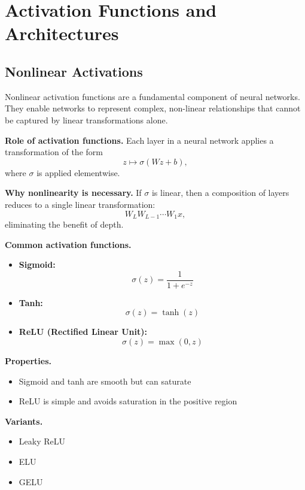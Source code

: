 \chapter{Activation Functions and Architectures}

\section{Nonlinear Activations}

Nonlinear activation functions are a fundamental component of neural networks. They enable networks to represent complex, non-linear relationships that cannot be captured by linear transformations alone.

\medskip

\noindent
\textbf{Role of activation functions.}  
Each layer in a neural network applies a transformation of the form
\[
z \mapsto \sigma(W z + b),
\]
where $\sigma$ is applied elementwise.

\medskip

\noindent
\textbf{Why nonlinearity is necessary.}  
If $\sigma$ is linear, then a composition of layers reduces to a single linear transformation:
\[
W_L W_{L-1} \cdots W_1 x,
\]
eliminating the benefit of depth.

\medskip

\noindent
\textbf{Common activation functions.}

\begin{itemize}
    \item \textbf{Sigmoid:}
    \[
    \sigma(z) = \frac{1}{1 + e^{-z}}
    \]

    \item \textbf{Tanh:}
    \[
    \sigma(z) = \tanh(z)
    \]

    \item \textbf{ReLU (Rectified Linear Unit):}
    \[
    \sigma(z) = \max(0, z)
    \]
\end{itemize}

\medskip

\noindent
\textbf{Properties.}
\begin{itemize}
    \item Sigmoid and tanh are smooth but can saturate
    \item ReLU is simple and avoids saturation in the positive region
\end{itemize}

\medskip

\noindent
\textbf{Variants.}
\begin{itemize}
    \item Leaky ReLU
    \item ELU
    \item GELU
\end{itemize}

